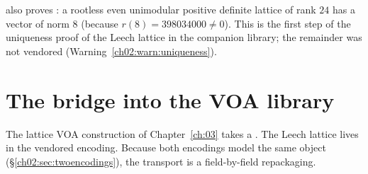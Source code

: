 \begin{remark}
 also proves : a
rootless even unimodular positive definite lattice of rank $24$ has a vector of norm $8$ (because
$r(8)=398034000\ne0$).  This is the first step of the uniqueness proof of the Leech lattice in the
companion library; the remainder was not vendored (Warning~\ref{ch02:warn:uniqueness}).
\end{remark}

\section{The bridge into the VOA library}\label{ch02:sec:bridge}

The lattice VOA construction of Chapter~\ref{ch:03} takes a .  The
Leech lattice lives in the vendored encoding.  Because both encodings model the same object
(\S\ref{ch02:sec:twoencodings}), the transport is a field-by-field repackaging.

